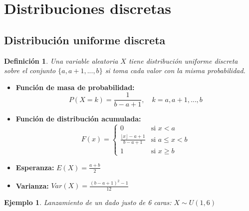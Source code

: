 \documentclass[landscape,twocolumn]{article}
\newtheorem{definition}[theorem]{Definición}
\newtheorem{example}{Ejemplo}[section]
\begin{document}
\section{Distribuciones discretas}

\subsection{Distribución uniforme discreta}
\begin{definition}
Una variable aleatoria $X$ tiene distribución uniforme discreta sobre el conjunto $\{a, a+1, ..., b\}$ si toma cada valor con la misma probabilidad.
\end{definition}

\begin{itemize}
    \item \textbf{Función de masa de probabilidad:}
    \[ P(X = k) = \frac{1}{b-a+1}, \quad k = a, a+1, ..., b \]
    
    \item \textbf{Función de distribución acumulada:}
    \[ F(x) = \begin{cases}
        0 & \text{si } x < a \\
        \frac{\lfloor x \rfloor - a + 1}{b-a+1} & \text{si } a \leq x < b \\
        1 & \text{si } x \geq b
    \end{cases} \]
    
    \item \textbf{Esperanza:} $E(X) = \frac{a+b}{2}$
    
    \item \textbf{Varianza:} $Var(X) = \frac{(b-a+1)^2-1}{12}$
\end{itemize}

\begin{example}
Lanzamiento de un dado justo de 6 caras: $X \sim U(1,6)$
\end{example}

\begin{center}
\end{center}
\end{document}
